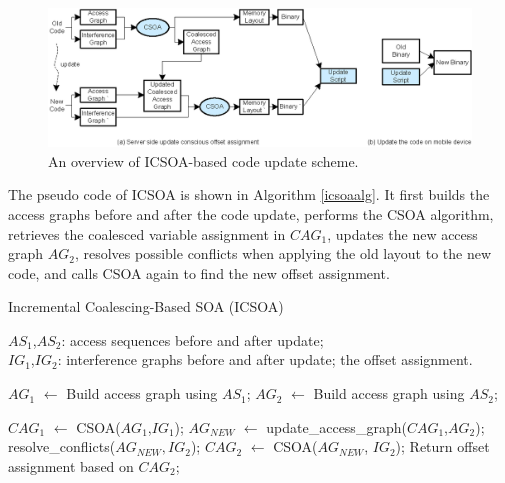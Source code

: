 \begin{figure}[htbp]
\begin{center}
\includegraphics[scale=1.2]{./figures/icsoa-overview.eps}
\caption{An overview of ICSOA-based code update scheme.}
\label{ioverview}
\end{center}
\end{figure}


The pseudo code of ICSOA is shown in Algorithm \ref{icsoaalg}. It first builds the access graphs before and after the code update, performs the CSOA algorithm, retrieves the coalesced variable assignment in $\textit{CAG}_1$, updates the new access graph $\textit{AG}_2$, resolves possible conflicts when applying the old layout to the new code, and calls CSOA again to find the new offset assignment. 

\begin{algorithm}
\caption{Incremental Coalescing-Based SOA (ICSOA)}
\singlespace
\label{icsoaalg}
\begin{algorithmic}[1]
\singlespace
\REQUIRE $\textit{AS}_1$,$\textit{AS}_2$: access sequences before and after update; \\
				 $\textit{IG}_1$,$\textit{IG}_2$: interference graphs before and after update;
\ENSURE the offset assignment.

\STATE $\textit{AG}_1$ $\leftarrow$ Build access graph using $\textit{AS}_1$;
\STATE $\textit{AG}_2$ $\leftarrow$ Build access graph using $\textit{AS}_2$;

\STATE $\textit{CAG}_1$ $\leftarrow$ CSOA($\textit{AG}_1$,$\textit{IG}_1$); 
\STATE $\textit{AG}_\textit{NEW}$ $\leftarrow$ update\_access\_graph($\textit{CAG}_1$,$\textit{AG}_2$); 
\STATE resolve\_conflicts($\textit{AG}_\textit{NEW},\textit{IG}_2$); 
\STATE $\textit{CAG}_2$ $\leftarrow$ CSOA($\textit{AG}_\textit{NEW}$, $\textit{IG}_2$);
\STATE Return offset assignment based on $\textit{CAG}_2$;
\end{algorithmic}
\end{algorithm}


